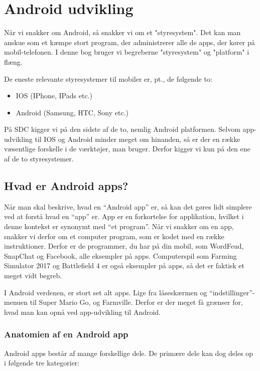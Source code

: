\chapter{Android udvikling}

Når vi snakker om Android, så snakker vi om et "styresystem". Det kan man 
anskue som et kæmpe stort program, der administrerer alle de apps, der kører på 
mobil-telefonen. I denne bog bruger vi begreberne "styresystem" og "platform" 
i flæng.

De eneste relevante styresystemer til mobiler er, pt., de følgende to:

\begin{itemize}
	\item IOS (IPhone, IPads etc.)
	\item Android (Samsung, HTC, Sony etc.)
\end{itemize}

På SDC kigger vi på den sidste af de to, nemlig Android platformen. Selvom 
app-udvikling til IOS og Android minder meget om hinanden, så er der en række 
væsentlige forskelle i de værktøjer, man bruger. Derfor kigger vi kun på den ene 
af de to styresystemer.

\section{Hvad er Android apps?}


Når man skal beskrive, hvad en ``Android app'' er, så kan det gøres lidt 
simplere ved at forstå hvad en ``app'' er. App er en forkortelse for 
applikation, hvilket i denne kontekst er synonymt med ``et program''. Når vi 
snakker om en app, snakker vi derfor om et computer program, som er kodet med 
en række instruktioner. Derfor er de programmer, du har på din mobil, som 
WordFeud, SnapChat og Facebook, alle eksempler på apps. Computerspil som 
Farming Simulator 2017 og Battlefield 4 er også eksempler på apps, så 
det er faktisk et meget vidt begreb. 

I Android verdenen, er stort set alt apps. Lige fra låseskærmen og 
``indstillinger''-menuen til Super Mario Go, og Farmville. Derfor er der meget 
få grænser for, hvad man kan opnå ved app-udvikling til Android.

\subsection{Anatomien af en Android app}
Android apps består af mange forskellige dele. De primære dele kan dog deles op i følgende tre kategorier:

